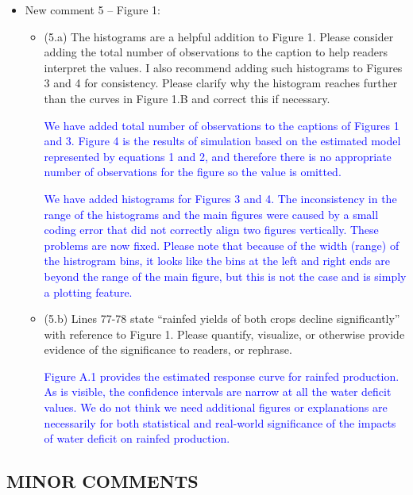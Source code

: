\documentclass[
]{article}
\begin{document}
\begin{itemize}
\begin{itemize}
  \end{itemize}

\item New comment 5 – Figure 1:

  \begin{itemize}
   \item (5.a) The histograms are a helpful addition to Figure 1. Please consider adding the total number of observations to the caption to help readers interpret the values. I also recommend adding such histograms to Figures 3 and 4 for consistency. Please clarify why the histogram reaches further than the curves in Figure 1.B and correct this if necessary.

   \textcolor{blue}{We have added total number of observations to the captions of Figures 1 and 3. Figure 4 is the results of simulation based on the estimated model represented by equations 1 and 2, and therefore there is no appropriate number of observations for the figure so the value is omitted.}

   \textcolor{blue}{We have added histograms for Figures 3 and 4. The inconsistency in the range of the histograms and the main figures were caused by a small coding error that did not correctly align two figures vertically. These problems are now fixed. Please note that because of the width (range) of the histrogram bins, it looks like the bins at the left and right ends are beyond the range of the main figure, but this is not the case and is simply a plotting feature.}

  \item (5.b) Lines 77-78 state ``rainfed yields of both crops decline significantly'' with reference to Figure 1. Please quantify, visualize, or otherwise provide evidence of the significance to readers, or rephrase.

  \textcolor{blue}{Figure A.1 provides the estimated response curve for rainfed production. As is visible, the confidence intervals are narrow at all the water deficit values. We do not think we need additional figures or explanations are necessarily for both statistical and real-world significance of the impacts of water deficit on rainfed production.}

  \end{itemize}

\end{itemize}

\subsection{MINOR COMMENTS}
\end{document}
